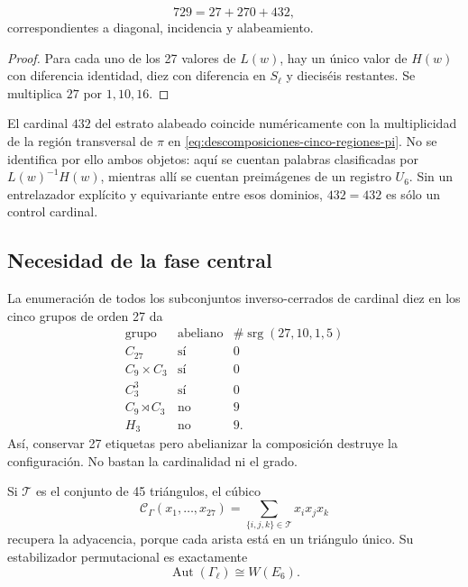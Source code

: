 \begin{theorem}
\label{p12-83-c20-s6:thm:particion-hensel-schlafli-nueva}
\begin{equation}
 729=27+270+432,
 \label{p12-83-c20-s6:eq:particion-729-e6-nueva}
\end{equation}
correspondientes a diagonal, incidencia y alabeamiento.
\end{theorem}

\begin{proof}
Para cada uno de los 27 valores de \(L(w)\), hay un único valor de
\(H(w)\) con diferencia identidad, diez con diferencia en \(S_\ell\) y
dieciséis restantes. Se multiplica \(27\) por \(1,10,16\).
\end{proof}

El cardinal \(432\) del estrato alabeado coincide numéricamente con la
multiplicidad de la región transversal de \(\pi\) en
\cref{eq:descomposiciones-cinco-regiones-pi}. No se identifica por ello ambos objetos: aquí
se cuentan palabras clasificadas por \(L(w)^{-1}H(w)\), mientras allí se
cuentan preimágenes de un registro \(U_6\). Sin un entrelazador explícito y
equivariante entre esos dominios, \(432=432\) es sólo un control cardinal.

\subsection{Necesidad de la fase central}

La enumeración de todos los subconjuntos inverso-cerrados de cardinal diez
en los cinco grupos de orden 27 da
\[
\begin{array}{c|c|c}
\text{grupo}&\text{abeliano}&
\#\operatorname{srg}(27,10,1,5)\\ \hline
C_{27}&\text{sí}&0\\
C_9\times C_3&\text{sí}&0\\
C_3^3&\text{sí}&0\\
C_9\rtimes C_3&\text{no}&9\\
H_3&\text{no}&9.
\end{array}
\]
Así, conservar 27 etiquetas pero abelianizar la composición destruye la
configuración. No bastan la cardinalidad ni el grado.

Si \(\mathcal T\) es el conjunto de 45 triángulos, el cúbico
\[
 \mathcal C_\Gamma(x_1,\ldots,x_{27})
 =\sum_{\{i,j,k\}\in\mathcal T}x_ix_jx_k
\]
recupera la adyacencia, porque cada arista está en un triángulo único. Su
estabilizador permutacional es exactamente
\[
 \operatorname{Aut}(\Gamma_\ell)\cong W(E_6).
\]

